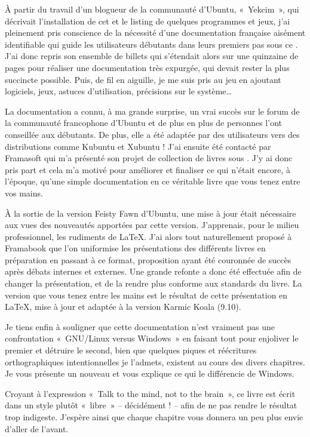 À partir du travail d'un blogueur de la communauté d'Ubuntu, «~Yekcim~», qui décrivait l'installation de cet  et le listing de quelques programmes et jeux, j'ai pleinement pris conscience de la nécessité d'une documentation française aisément identifiable qui guide les utilisateurs débutants dans leurs premiers pas sous ce . J'ai donc repris son ensemble de billets qui s'étendait alors sur une quinzaine de pages pour réaliser une documentation très expurgée, qui devait rester la plus succincte possible. Puis, de fil en aiguille, je me suis pris au jeu en ajoutant logiciels, jeux, astuces d'utilisation, précisions sur le système\ldots{}\par
La documentation a connu, à ma grande surprise, un vrai succès sur le forum de la communauté francophone d'Ubuntu et de plus en plus de personnes l'ont conseillée aux débutants. De plus, elle a été adaptée par des utilisateurs vers des distributions comme Kubuntu et Xubuntu ! J'ai ensuite été contacté par Framasoft qui m'a présenté son projet de collection de livres sous . J'y ai donc pris part et cela m'a motivé pour améliorer et finaliser ce qui n'était encore, à l'époque, qu'une simple documentation en ce véritable livre que vous tenez entre vos mains.\par
À la sortie de la version Feisty Fawn d'Ubuntu, une mise à jour était nécessaire aux vues des nouveautés apportées par cette version. J'apprenais, pour le milieu professionnel, les rudiments de \LaTeX{}. J'ai alors tout naturellement proposé à Framabook que l'on uniformise les présentations des différents livres en préparation en passant à ce format, proposition ayant été couronnée de succès après débats internes et externes. Une grande refonte a donc été effectuée afin de changer la présentation, et de la rendre plus conforme aux standards du livre. La version que vous tenez entre les mains est le résultat de cette présentation en \LaTeX{}, mise à jour et adaptée à la version Karmic Koala (9.10).\par
Je tiens enfin à souligner que cette documentation n'est vraiment pas une confrontation «~GNU/Linux versus Windows~» en faisant tout pour enjoliver le premier et détruire le second, bien que quelques piques et réécritures orthographiques intentionnelles je l'admets, existent au cours des divers chapitres. Je vous présente un nouveau  et vous explique ce qui le différencie de Windows.\par
Croyant à l'expression «~Talk to the mind, not to the brain~», ce livre est écrit dans un style plutôt «~libre~» -- décidément ! -- afin de ne pas rendre le résultat trop indigeste. J'espère ainsi que chaque chapitre vous donnera un peu plus envie d'aller de l'avant.\par
